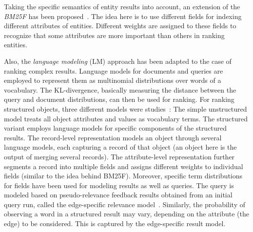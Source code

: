 Taking the specific semantics of entity results into account, an extension of the \emph{BM25F} has been proposed~\cite{DBLP:conf/semweb/BlancoMV11}. The idea here is to use different fields for indexing different attributes of entities. Different weights are assigned to these fields to recognize that some attributes are more important than others in ranking entities. 

Also, the \emph{language modeling} (LM) approach has been adapted to the case of ranking complex results. Language models for documents and queries are employed to represent them as multinomial distributions over words of a vocabulary. The KL-divergence, basically measuring the distance between the query and document distributions, can then be used for ranking. For ranking structured objects, three different models were studies~\cite{DBLP:conf/www/NieMSWM07}: The simple unstructured model treats all object attributes and values as vocabulary terms. The structured variant employs language models for specific components of the structured results. The record-level representation models an object through several language models, each capturing a record of that object (an object here is the output of merging several records). The attribute-level representation further segments a record into multiple fields and assigns different weights to individual fields (similar to the idea behind BM25F). 
Moreover, specific term distributions for fields have been used for modeling results as well as queries. The query is modeled based on pseudo-relevance feedback results obtained from an initial query run, called the edge-specific relevance model~\cite{DBLP:conf/cikm/BicerTN11}. Similarly, the probability of observing a word in a structured result may vary, depending on the attribute (the edge) to be considered. This is captured by the edge-specific result model. 
%

